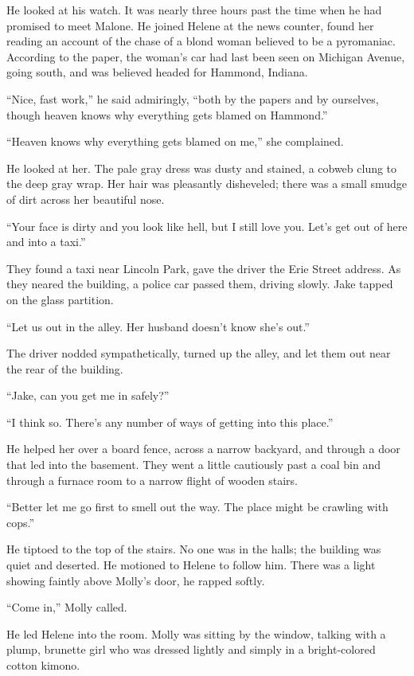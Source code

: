 \documentclass{novel}
\begin{document}
He looked at his watch. It was nearly three hours past the time when he had promised to meet Malone. He joined Helene at the news counter, found her reading an account of the chase of a blond woman believed to be a pyromaniac. According to the paper, the woman’s car had last been seen on Michigan Avenue, going south, and was believed headed for Hammond, Indiana.

“Nice, fast work,” he said admiringly, “both by the papers and by ourselves, though heaven knows why everything gets blamed on Hammond.”

“Heaven knows why everything gets blamed on me,” she complained.

He looked at her. The pale gray dress was dusty and stained, a cobweb clung to the deep gray wrap. Her hair was pleasantly disheveled; there was a small smudge of dirt across her beautiful nose.

“Your face is dirty and you look like hell, but I still love you. Let’s get out of here and into a taxi.”

They found a taxi near Lincoln Park, gave the driver the Erie Street address. As they neared the building, a police car passed them, driving slowly. Jake tapped on the glass partition.

“Let us out in the alley. Her husband doesn’t know she’s out.”

The driver nodded sympathetically, turned up the alley, and let them out near the rear of the building.

“Jake, can you get me in safely?”

“I think so. There’s any number of ways of getting into this place.”

He helped her over a board fence, across a narrow backyard, and through a door that led into the basement. They went a little cautiously past a coal bin and through a furnace room to a narrow flight of wooden stairs.

“Better let me go first to smell out the way. The place might be crawling with cops.”

He tiptoed to the top of the stairs. No one was in the halls; the building was quiet and deserted. He motioned to Helene to follow him. There was a light showing faintly above Molly’s door, he rapped softly.

“Come in,” Molly called.

He led Helene into the room. Molly was sitting by the window, talking with a plump, brunette girl who was dressed lightly and simply in a bright-colored cotton kimono.
\end{document}
